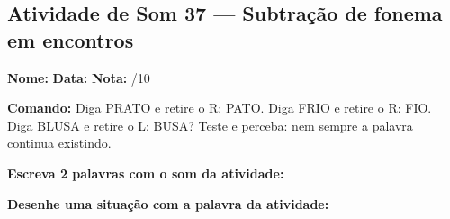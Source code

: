 \subsection{Atividade de Som 37 --- Subtração de fonema em encontros}
\begin{exercicio}



\noindent\textbf{Nome:} \underline{\hspace{3.2cm}} \quad \textbf{Data:} \underline{\hspace{1.6cm}} \quad \textbf{Nota:} \underline{\hspace{0.9cm}}/10


\noindent\textbf{Comando:} Diga PRATO e retire o R: PATO. Diga FRIO e retire o R: FIO. Diga BLUSA e retire o L: BUSA? Teste e perceba: nem sempre a palavra continua existindo.


\begin{center}
\end{center}

\noindent\textbf{Escreva 2 palavras com o som da atividade:}

\begin{center}
  \underline{\hspace{3cm}} \quad \underline{\hspace{3cm}}
\end{center}

\noindent\textbf{Desenhe uma situação com a palavra da atividade:}

\begin{center}
\end{center}

\end{exercicio}



